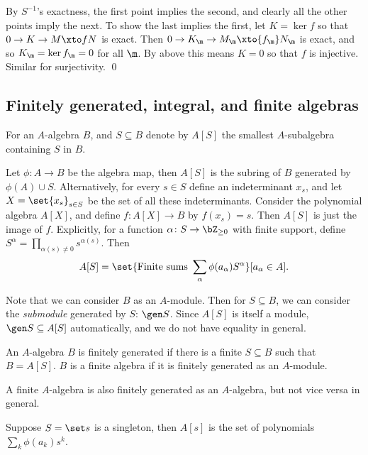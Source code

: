 \ecoro

\bproof

    By $S^{-1}$'s exactness, the first point implies the second, and clearly all the other points imply the next.
    To show the last implies the first, let $K=\ker f$ so that $0\to K\to M\xto fN$ is exact.
    Then $0\to K_\m\to M_\m\xto{f_\m}N_\m$ is exact, and so $K_\m=\ker f_\m=0$ for all $\m$.
    By above this means $K=0$ so that $f$ is injective.
    Similar for surjectivity.
    \qed

\eproof

\subsection{Finitely generated, integral, and finite algebras}

\bdefn

    For an $A$-algebra $B$, and $S\subseteq B$ denote by $A[S]$ the smallest $A$-subalgebra containing $S$ in $B$.

\edefn

Let $\phi\colon A\to B$ be the algebra map, then $A[S]$ is the subring of $B$ generated by $\phi(A)\cup S$.
Alternatively, for every $s\in S$ define an indeterminant $x_s$, and let $X=\set{x_s}_{s\in S}$ be the set of all these indeterminants.
Consider the polynomial algebra $A[X]$, and define $f\colon A[X]\to B$ by $f(x_s)=s$.
Then $A[S]$ is just the image of $f$.
Explicitly, for a function $\alpha\colon S\to\bZ_{\geq0}$ with finite support, define $S^\alpha=\prod_{\alpha(s)\neq0}s^{\alpha(s)}$.
Then
$$ A[S] = \set{\hbox{Finite sums }\sum_\alpha\phi(a_\alpha)S^\alpha}[a_\alpha\in A] . $$

Note that we can consider $B$ as an $A$-module.
Then for $S\subseteq B$, we can consider the {\it submodule\/} generated by $S$: $\gen S$.
Since $A[S]$ is itself a module, $\gen S\subseteq A[S]$ automatically, and we do not have equality in general.

\bdefn

    An $A$-algebra $B$ is {\emphcolor finitely generated} if there is a finite $S\subseteq B$ such that $B=A[S]$.
    $B$ is a {\emphcolor finite algebra} if it is finitely generated as an $A$-module.

\edefn

A finite $A$-algebra is also finitely generated as an $A$-algebra, but not vice versa in general.

\bexam

    Suppose $S=\set s$ is a singleton, then $A[s]$ is the set of polynomials $\sum_k\phi(a_k)s^k$.

